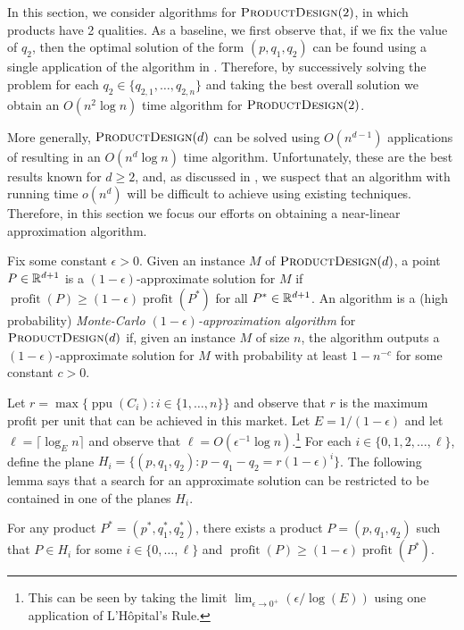 \documentclass[lotsofwhite]{patmorin}
\newcommand{\ppu}{\operatorname{ppu}}
\newcommand{\val}{\operatorname{profit}}
\newcommand{\eps}{\epsilon}
\begin{document}
In this section, we consider algorithms for $\textsc{ProductDesign}(2)$, in
which products have 2 qualities.  As a baseline, we first observe that, if
we fix the value of $q_2$, then the optimal solution of the form $(p, q_1,
q_2)$ can be found using a single application of the algorithm in
.  Therefore, by successively solving the problem for each $q_2
\in\{q_{2,1},\ldots,q_{2,n}\}$ and taking the best overall solution we
obtain an $O(n^2\log n)$ time algorithm for $\textsc{ProductDesign}(2)$.

More generally, $\textsc{ProductDesign}(d)$ can be solved using
$O(n^{d-1})$ applications of  resulting in an $O(n^d\log n)$
time algorithm.  Unfortunately, these are the best results known for $d \ge
2$, and, as discussed in , we suspect that an algorithm
with running time $o(n^d)$ will be difficult to achieve using existing
techniques.  Therefore, in this section we focus our efforts on obtaining a
near-linear approximation algorithm.

Fix some constant $\epsilon > 0$.  Given an instance $M$ of
$\textsc{ProductDesign}(d)$, a point $P\in\mathbb{R}^{d+1}$ is a
$(1-\eps)$-approximate solution for $M$ if $\val(P) \ge (1-\eps)\val(P^*)$
for all $P^*\in\mathbb{R}^{d+1}$.  An algorithm is a (high probability)
\emph{Monte-Carlo $(1-\eps)$-approximation algorithm} for
$\textsc{ProductDesign}(d)$ if, given an instance $M$ of size $n$, the
algorithm outputs a $(1-\eps)$-approximate solution for $M$ with
probability at least $1-n^{-c}$ for some constant $c>0$.

Let $r=\max\{\ppu(C_i) : i\in\{1,\ldots, n\}\}$ and observe that $r$
is the maximum profit per unit that can be achieved in this market.
Let $E=1/(1-\eps)$ and let $\ell = \lceil\log_E n\rceil$ and observe
that $\ell = O(\eps^{-1}\log n)$.\footnote{This can be seen by taking the
limit $\lim_{\eps\rightarrow 0^+} (\eps/\log(E))$ using one application
of L'H\^opital's Rule.} For each $i\in\{0,1,2,\ldots,\ell\}$, define the
plane $H_i = \{ (p,q_1,q_2) : p-q_1-q_2 = r(1-\eps)^i \}$.  The following
lemma says that a search for an approximate solution can be restricted
to be contained in one of the planes $H_i$.

\begin{lem}
  For any product $P^*=(p^*,q_1^*,q_2^*)$, there exists a product
  $P=(p,q_1,q_2)$ such that $P\in H_i$ for some $i\in\{0,\ldots,\ell\}$
  and $\val(P) \ge (1-\eps)\val(P^*)$.
\end{lem}
\end{document}
